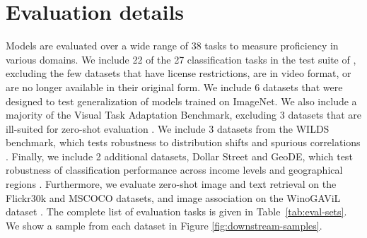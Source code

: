 \begin{table}
\caption{Experimental configuration for each scale, including the size of the pool we provide, the model architecture and hyperparameters.}
\setlength\tabcolsep{4.5pt}
    \renewcommand{\arraystretch}{1.1}
\small
\centering
{}
\label{tab:train-hparams}
\end{table}



\section{Evaluation details}
\label{sec:app-eval}

Models are evaluated over a wide range of 38 tasks to measure proficiency in various domains. We include 22 of the 27 classification tasks in the test suite of \citet{radford2021learning}, excluding the few datasets that have license restrictions, are in video format, or are no longer available in their original form. We include 6 datasets that were designed to test generalization of models trained on ImageNet. We also include a majority of the Visual Task Adaptation Benchmark, excluding 3 datasets that are ill-suited for zero-shot evaluation \cite{vtab}. We include 3 datasets from the WILDS benchmark, which tests robustness to distribution shifts and spurious correlations \cite{wilds2021,sagawa2022extending}. Finally, we include 2 additional datasets, Dollar Street and GeoDE, which test robustness of classification performance across income levels and geographical regions \cite{rojas2022dollar,ramaswamy2022geode}. Furthermore, we evaluate zero-shot image and text retrieval on the Flickr30k and MSCOCO datasets, and image association on the WinoGAViL dataset \cite{flickr30k,mscoco,bitton2022winogavil}.
The complete list of evaluation tasks is given in Table~\ref{tab:eval-sets}. We show a sample from each dataset in Figure \ref{fig:downstream-samples}.


